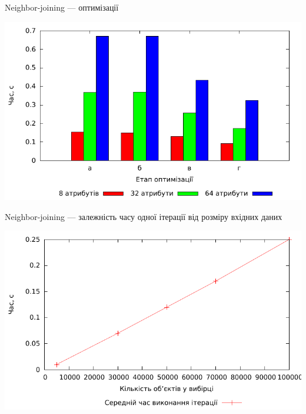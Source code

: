\documentclass{beamer}
\begin{document}
        
    \begin{frame}{Neighbor-joining --- оптимізації}
        \begin{center}
            \includegraphics[scale=0.8]{nj_compare.pdf}
        \end{center}
    \end{frame}
    
    \begin{frame}{Neighbor-joining --- залежність часу одної ітерації від розміру вхідних даних}
        \begin{center}
            \includegraphics[scale=0.8]{nj_complexity.pdf}
        \end{center}
    \end{frame}
    
\end{document}
